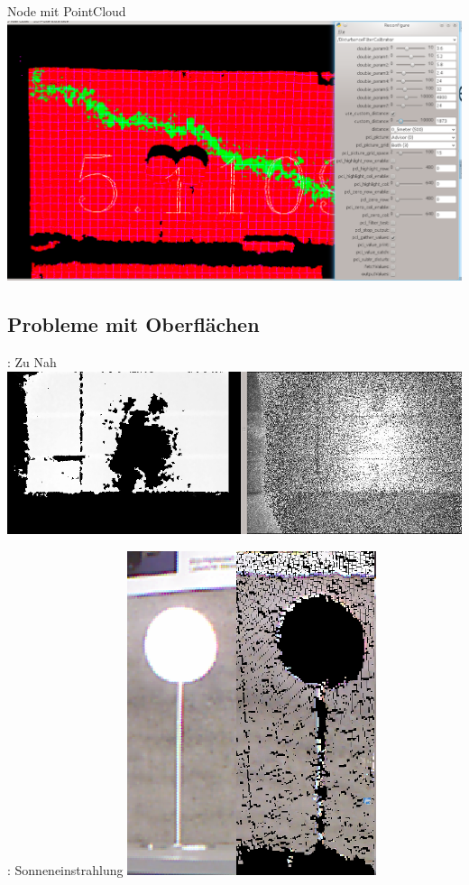 \documentclass{VLKlauck}
\begin{document}
	\begin{frame}{Node mit PointCloud}
		\includegraphics[scale=0.35]{disturbance_filter_calibrator1.png}	
	\end{frame}
	
	
	\subsection{Probleme mit Oberflächen}
		
	\begin{frame}{\insertsubsection: Zu Nah}	
		\includegraphics[scale=0.4]{ToClose.png}
	\end{frame}
			
	\begin{frame}{\insertsubsection: Sonneneinstrahlung}	
		\includegraphics[scale=1.2]{Sun.png}
	\end{frame}
			
\end{document}
